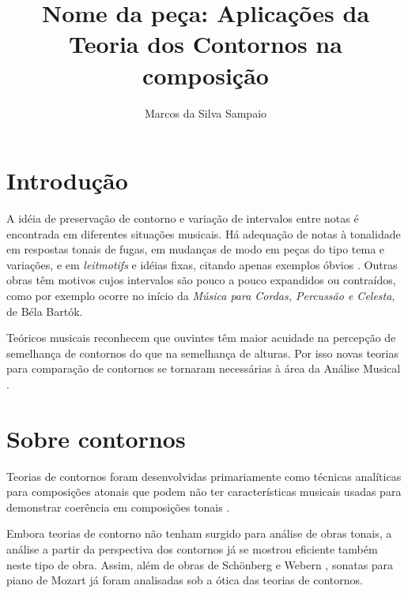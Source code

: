 \documentclass[12pt,brazil]{book}
\title{Nome da peça: Aplicações da Teoria dos Contornos na composição}
\author{Marcos da Silva Sampaio}
\newcommand{\eng}[1]{\textit{#1}}
\newcommand{\opus}[1]{\textit{#1}}
\begin{document}
\maketitle
\tableofcontents
\listoftables
\listoffigures

\chapter{Introdução}
\label{cha:introducao}

A idéia de preservação de contorno e variação de intervalos entre
notas é encontrada em diferentes situações musicais. Há adequação de
notas à tonalidade em respostas tonais de fugas, em mudanças de modo
em peças do tipo tema e variações, e em \eng{leitmotifs} e idéias
fixas, citando apenas exemplos óbvios
\cite[p. 29]{morris87:composition}. Outras obras têm motivos cujos
intervalos são pouco a pouco expandidos ou contraídos, como por
exemplo ocorre no início da \opus{Música para Cordas, Percussão e
  Celesta}, de Béla Bartók.

Teóricos musicais reconhecem que ouvintes têm maior acuidade na
percepção de semelhança de contornos do que na semelhança de
alturas. Por isso novas teorias para comparação de contornos se
tornaram necessárias à área da Análise Musical
\cite[p. 226]{marvin.ea87:relating}.

\chapter{Sobre contornos}
\label{cha:sobre-contornos}



Teorias de contornos foram desenvolvidas primariamente como técnicas
analíticas para composições atonais que podem não ter características
musicais usadas para demonstrar coerência em composições tonais
\cite[p. 1]{beard03:contour}.

Embora teorias de contorno não tenham surgido para análise de obras
tonais, a análise a partir da perspectiva dos contornos já se mostrou
eficiente também neste tipo de obra. Assim, além de obras de Schönberg
\cite{friedmann85:methodology} e Webern \cite{clifford95:contour},
sonatas para piano de Mozart \cite{beard03:contour} já foram
analisadas sob a ótica das teorias de contornos.
\end{document}
